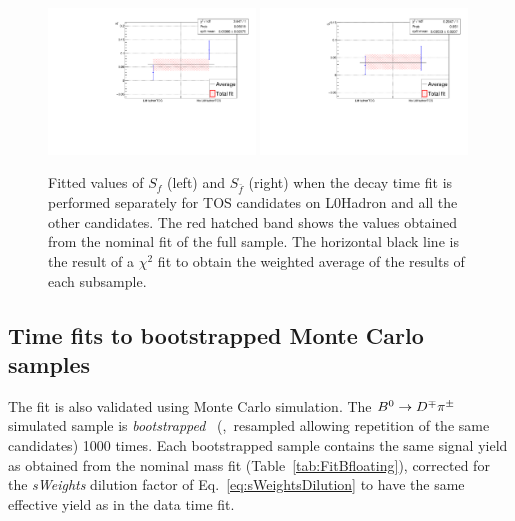 \begin{figure}[htpb]
        \begin{center}
                \includegraphics[width=0.49\textwidth]{05DecaytimeFit/figs/splits/Sf_splits_L0HadTos.pdf}
                \includegraphics[width=0.49\textwidth]{05DecaytimeFit/figs/splits/Sfbar_splits_L0HadTos.pdf}
        \end{center}
        \vspace{-2mm}
        \caption{Fitted values of $S_f$ (left) and $S_{\bar f}$ (right) when the decay time fit is performed separately for TOS candidates on L0Hadron and all the other candidates.
        The red hatched band shows the values obtained from the nominal fit of the full sample.
        The horizontal black line is the result of a $\chi^2$ fit to obtain the weighted average of the results of each subsample.}
        \label{fig:L0_splits}
\end{figure}

\subsection{Time fits to bootstrapped Monte Carlo samples}
\label{sec:mcbootstrap}
The fit is also validated using Monte Carlo simulation. The $B^0\rightarrow D^\mp\pi^\pm$ simulated sample is \emph{bootstrapped}~\cite{bootstrapping} (\ie,~resampled allowing
repetition of the same candidates) 1000 times. Each bootstrapped sample contains the same signal yield as obtained from
the nominal mass fit (Table~\ref{tab:FitBfloating}), corrected for the \emph{sWeights} dilution factor of
Eq.~\ref{eq:sWeightsDilution} to have the same effective yield as in the data time fit.

